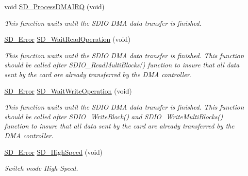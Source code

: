 \begin{DoxyCompactItemize}
void \hyperlink{group__sd__card_ga52ec18498c19918549142f6680a7b21e}{S\+D\+\_\+\+Process\+D\+M\+A\+I\+RQ} (void)
\begin{DoxyCompactList}\small\item\em This function waits until the S\+D\+IO D\+MA data transfer is finished. \end{DoxyCompactList}\item 
\hyperlink{group__sd__card_gacff91fa68daa1d1ee967b5b3fb3dbd8c}{S\+D\+\_\+\+Error} \hyperlink{group__sd__card_ga42ab410b834d74d7f3ee757dc888b8cc}{S\+D\+\_\+\+Wait\+Read\+Operation} (void)
\begin{DoxyCompactList}\small\item\em This function waits until the S\+D\+IO D\+MA data transfer is finished. This function should be called after S\+D\+I\+O\+\_\+\+Read\+Multi\+Blocks() function to insure that all data sent by the card are already transferred by the D\+MA controller. \end{DoxyCompactList}\item 
\hyperlink{group__sd__card_gacff91fa68daa1d1ee967b5b3fb3dbd8c}{S\+D\+\_\+\+Error} \hyperlink{group__sd__card_gad55967ea67075f01671fb2144c7f7b0d}{S\+D\+\_\+\+Wait\+Write\+Operation} (void)
\begin{DoxyCompactList}\small\item\em This function waits until the S\+D\+IO D\+MA data transfer is finished. This function should be called after S\+D\+I\+O\+\_\+\+Write\+Block() and S\+D\+I\+O\+\_\+\+Write\+Multi\+Blocks() function to insure that all data sent by the card are already transferred by the D\+MA controller. \end{DoxyCompactList}\item 
\hyperlink{group__sd__card_gacff91fa68daa1d1ee967b5b3fb3dbd8c}{S\+D\+\_\+\+Error} \hyperlink{group__sd__card_ga2457c748cf09c7ad5d3c9211d11e3fab}{S\+D\+\_\+\+High\+Speed} (void)
\begin{DoxyCompactList}\small\item\em Switch mode High-\/\+Speed. \end{DoxyCompactList}\end{DoxyCompactItemize}

